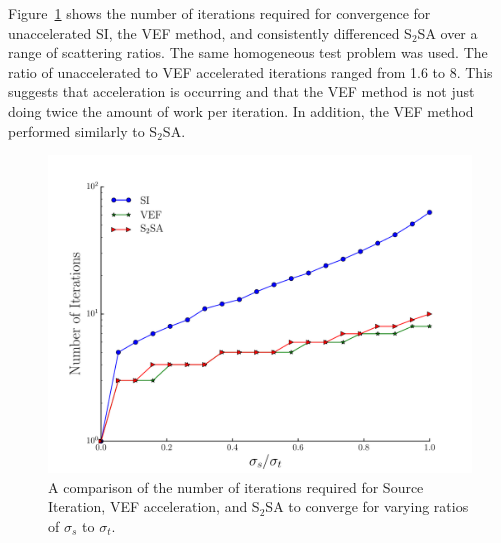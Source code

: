 Figure~\ref{fig:si_vef_s2sa} shows the number of iterations required for convergence for unaccelerated SI, the VEF method, and consistently differenced S$_2$SA over a range of scattering ratios. The same homogeneous test problem was used. The ratio of unaccelerated to VEF accelerated iterations ranged from 1.6 to 8. This suggests that acceleration is occurring and that the VEF method is not just doing twice the amount of work per iteration. In addition, the VEF method performed similarly to S$_2$SA.

	\begin{figure}
		\centering
		\includegraphics[width=.75\textwidth]{figs/si_vef_s2sa.pdf} 
		\caption{A comparison of the number of iterations required for Source Iteration, VEF acceleration, and S$_2$SA to converge for varying ratios of $\sigma_s$ to $\sigma_t$. } 
		\label{fig:si_vef_s2sa}
	\end{figure}

